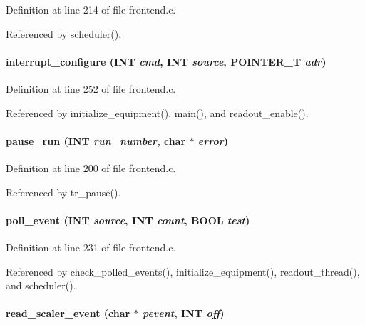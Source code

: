 Definition at line 214 of file frontend.c.

Referenced by scheduler().
\paragraph[{interrupt\_\-configure}]{ interrupt\_\-configure ({\bf INT} {\em cmd}, \/  {\bf INT} {\em source}, \/  POINTER\_\-T {\em adr})}\hfill\label{frontend_8c_a681a5d1fe2e8a4735bcf03824ffb3e81}


Definition at line 252 of file frontend.c.

Referenced by initialize\_\-equipment(), main(), and readout\_\-enable().
\paragraph[{pause\_\-run}]{ pause\_\-run ({\bf INT} {\em run\_\-number}, \/  char $\ast$ {\em error})}\hfill\label{frontend_8c_a164db20cf6c8c81e8c8ca50a590de436}


Definition at line 200 of file frontend.c.

Referenced by tr\_\-pause().
\paragraph[{poll\_\-event}]{ poll\_\-event ({\bf INT} {\em source}, \/  {\bf INT} {\em count}, \/  {\bf BOOL} {\em test})}\hfill\label{frontend_8c_a98cc3257284af91fa0e8da10ddf227c8}


Definition at line 231 of file frontend.c.

Referenced by check\_\-polled\_\-events(), initialize\_\-equipment(), readout\_\-thread(), and scheduler().
\paragraph[{read\_\-scaler\_\-event}]{ read\_\-scaler\_\-event (char $\ast$ {\em pevent}, \/  {\bf INT} {\em off})}\hfill\label{frontend_8c_af3ad062393c1437922bae26841d8927c}


